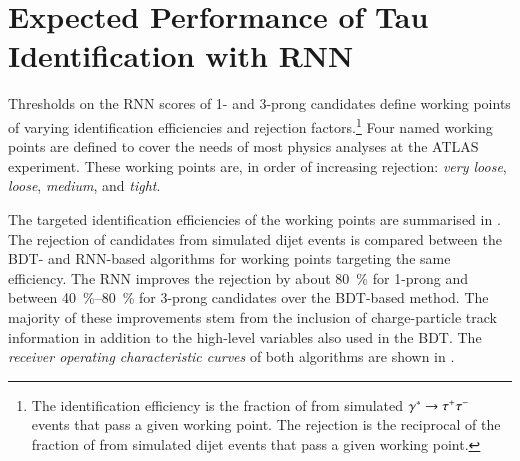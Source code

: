 \section{Expected Performance of Tau Identification with RNN}%
\label{sec:tauid_perf}

Thresholds on the RNN scores of 1- and 3-prong \tauhadvis candidates define
working points of varying \tauhadvis identification efficiencies and
\faketauhadvisC rejection factors.\footnote{The \tauhadvis identification
  efficiency is the fraction of \truetauhadvis from simulated
  $\gammastar \to \tautau$ events that pass a given working point. The
  \faketauhadvisC rejection is the reciprocal of the fraction of \faketauhadvis
  from simulated dijet events that pass a given working point.} Four named
working points are defined to cover the needs of most physics analyses at the
ATLAS experiment. These working points are, in order of increasing
\faketauhadvisC rejection: \emph{very loose}, \emph{loose}, \emph{medium}, and
\emph{tight}.

The targeted \tauhadvis identification efficiencies of the working points are
summarised in . The rejection of \faketauhadvis candidates from simulated
dijet events is compared between the BDT- and RNN-based \tauid algorithms for
working points targeting the same \truetauhadvisC efficiency. The RNN \tauid improves
the \faketauhadvisC rejection by about \SI{80}{\percent} for 1-prong and between
\SIrange[range-units=single]{40}{80}{\percent} for 3-prong \tauhadvis candidates over the BDT-based
method. The majority of these improvements stem from the inclusion of
charge-particle track information in addition to the high-level variables also
used in the BDT. The \emph{receiver operating characteristic curves} of both
algorithms are shown in .

\begin{table}[htbp]
  \centering

  \caption[Comparison of working points defined for the BDT- and RNN-based
  \tauid.]{Comparison of working points defined for the BDT- and RNN-based
    \tauid. Only the targeted \tauhadvis efficiency (target \tauhadvis eff.) of
    the working points is given, which can deviate by ca.\ \SI{1}{\percent} from
    the efficiency observed in simulated $\gammastar \to \tautau$ events. The
    \faketauhadvisC rejection is evaluated using the \tauhadvis candidate sample
    from dijet events. The table is adapted from
    Ref.~\cite{ATL-PHYS-PUB-2019-033}.}%
  \label{tab:rnn_wps}

  
\end{table}

